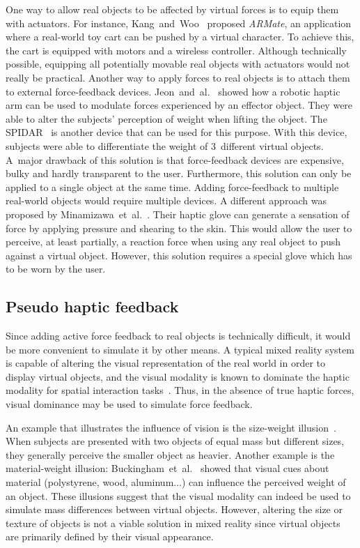 \documentclass{vgtc}
\begin{document}
One way to allow real objects to be affected by virtual forces is to equip them with actuators. For instance, Kang~and~Woo~\cite{kang11} proposed \emph{ARMate}, an application where a real-world toy cart can be pushed by a virtual character. To achieve this, the cart is equipped with motors and a wireless controller. Although technically possible, equipping all potentially movable real objects with actuators would not really be practical. Another way to apply forces to real objects is to attach them to external force-feedback devices. Jeon~and~al.~\cite{jeon11} showed how a robotic haptic arm can be used to modulate forces experienced by an effector object. They were able to alter the subjects' perception of weight when lifting the object. The SPIDAR~\cite{kim00} is another device that can be used for this purpose. With this device, subjects were able to differentiate the weight of 3~different virtual objects. A~major drawback of this solution is that force-feedback devices are expensive, bulky and hardly transparent to the user. Furthermore, this solution can only be applied to a single object at the same time. Adding force-feedback to multiple real-world objects would require multiple devices. A different approach was proposed by Minamizawa~et~al.~\cite{minamizawa07}. Their haptic glove can generate a sensation of force by applying pressure and shearing to the skin. This would allow the user to perceive, at least partially, a reaction force when using any real object to push against a virtual object. However, this solution requires a special glove which has to be worn by the user.

\subsection{Pseudo haptic feedback}

Since adding active force feedback to real objects is technically difficult, it would be more convenient to simulate it by other means. A typical mixed reality system is capable of altering the visual representation of the real world in order to display virtual objects, and the visual modality is known to dominate the haptic modality for spatial interaction tasks~\cite{hatwell03}. Thus, in the absence of true haptic forces, visual dominance may be used to simulate force feedback.

An example that illustrates the influence of vision is the size-weight illusion~\cite{murray99}. When subjects are presented with two objects of equal mass but different sizes, they generally perceive the smaller object as heavier. Another example is the material-weight illusion: Buckingham~et~al.~\cite{buckingham09} showed that visual cues about \mbox{material} (polystyrene, wood, aluminum...) can influence the perceived weight of an object. These illusions suggest that the visual modality can indeed be used to simulate mass differences between virtual objects. However, altering the size or texture of objects is not a viable solution in mixed reality since virtual objects are primarily defined by their visual appearance.
\end{document}
